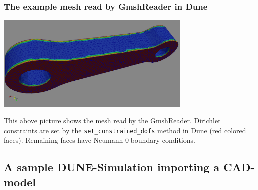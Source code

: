 \begin{frame}
  \frametitle<presentation>{The example mesh read by GmshReader in Dune}
  \begin{center}
    \includegraphics[width=0.7\textwidth]{./EPS/crank/crank_DirBC}
  \end{center}
  This above picture shows the mesh read by the GmshReader. Dirichlet constraints are
  set by the \lstinline!set_constrained_dofs! method in Dune (red colored
  faces). Remaining faces have Neumann-0 boundary conditions.
\end{frame}

\subsection{A sample DUNE-Simulation importing a CAD-model}

